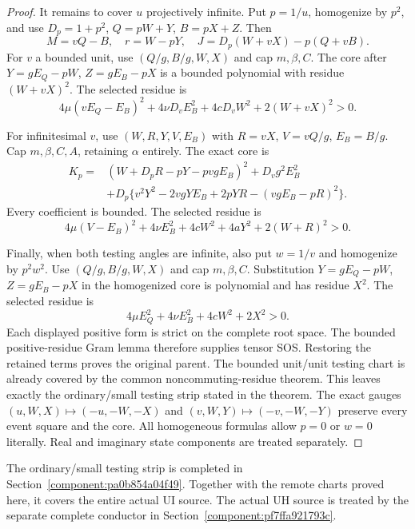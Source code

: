 \begin{proof}
It remains to cover $u$ projectively infinite. Put $p=1/u$,
homogenize by $p^2$, and use $D_p=1+p^2$,
$Q=pW+Y$, $B=pX+Z$. Then
\[
 M=vQ-B,\quad r=W-pY,\quad
 J=D_p(W+vX)-p(Q+vB).                              \tag{CR9}
\]
For $v$ a bounded unit, use $(Q/g,B/g,W,X)$ and cap $m,\beta,C$.
The core after $Y=gE_Q-pW$, $Z=gE_B-pX$ is a bounded polynomial
with residue $(W+vX)^2$. The selected residue is
\[
 4\mu(vE_Q-E_B)^2+4\nu D_vE_B^2
           +4cD_vW^2+2(W+vX)^2>0.                 \tag{CR10}
\]

For infinitesimal $v$, use $(W,R,Y,V,E_B)$ with
$R=vX$, $V=vQ/g$, $E_B=B/g$. Cap $m,\beta,C,A$, retaining
$\alpha$ entirely. The exact core is
\begin{align*}
K_p={}&(W+D_pR-pY-pvgE_B)^2+D_vg^2E_B^2\\
 &+D_p\{v^2Y^2-2vgYE_B+2pYR-(vgE_B-pR)^2\}.
                                                               \tag{CR11}
\end{align*}
Every coefficient is bounded. The selected residue is
\[
 4\mu(V-E_B)^2+4\nu E_B^2+4cW^2+4aY^2
                    +2(W+R)^2>0.                 \tag{CR12}
\]

Finally, when both testing angles are infinite, also put $w=1/v$
and homogenize by $p^2w^2$. Use $(Q/g,B/g,W,X)$ and cap
$m,\beta,C$. Substitution $Y=gE_Q-pW$, $Z=gE_B-pX$ in the
homogenized core is polynomial and has residue $X^2$.
The selected residue is
\[
 4\mu E_Q^2+4\nu E_B^2+4cW^2+2X^2>0.               \tag{CR13}
\]
Each displayed positive form is strict on the complete root space.
The bounded positive-residue Gram lemma therefore supplies tensor
SOS. Restoring the retained terms proves the original parent.
The bounded unit/unit testing chart is already covered by the
common noncommuting-residue theorem. This leaves exactly the
ordinary/small testing strip stated in the theorem. The exact gauges
$(u,W,X)\mapsto(-u,-W,-X)$ and
$(v,W,Y)\mapsto(-v,-W,-Y)$ preserve every event square and the core.
All homogeneous formulas allow $p=0$ or $w=0$ literally.
Real and imaginary state components are treated separately.
\end{proof}

The ordinary/small testing strip is completed in Section~\ref{component:pa0b854a04f49}. Together with the remote charts proved here, it covers the entire actual UI source. The actual UH source is treated by the separate complete conductor in Section~\ref{component:pf7ffa921793c}.



